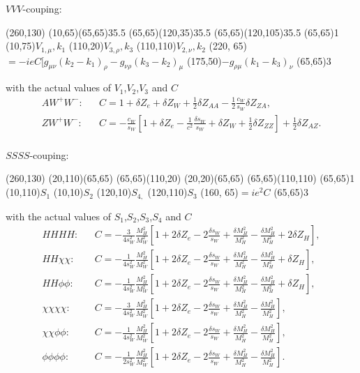$VVV$-couping:

\begin{axopicture}(260,130) %
	\Photon(10,65)(65,65){3}{5.5} 
	\Photon(65,65)(120,35){3}{5.5}
	\Photon(65,65)(120,105){3}{5.5}
	\Vertex(65,65){1}		
	\Text(10,75){$V_{1,\mu}, k_1$}
	\Text(110,20){$V_{3,\rho},k_3$}
	\Text(110,110){$V_{2,\nu},k_2$}
	\Text(220, 65){$=-ieC[g_{\mu\nu}(k_2-k_1)_\rho-g_{\nu\rho}(k_3-k_2)_\mu$}
	\Text(175,50){$-g_{\rho\mu}(k_1-k_3)_\nu$}
	\Vertex(65,65){3}
\end{axopicture}
\newline with the actual values of $V_1$,$V_2$,$V_3$ and $C$
\begin{eqnarray}
AW^+W^-:&&C=1+\delta Z_e+\delta Z_W+\frac{1}{2}\delta Z_{AA}-\frac{1}{2}\frac{c_W}{s_W}\delta Z_{ZA},\nonumber\\
ZW^+W^-:&&C=-\frac{c_W}{s_W}\left[1+\delta Z_e-\frac{1}{c^2}\frac{\delta s_W}{s_W}+\delta Z_W+\frac{1}{2}\delta Z_{ZZ}\right]+\frac{1}{2}\delta Z_{AZ}.\nonumber\\
\end{eqnarray}

$SSSS$-couping:

\begin{axopicture}(260,130) %
	\Line[dash](20,110)(65,65)
	\Line[dash](65,65)(110,20)
	\Line[dash](20,20)(65,65)
	\Line[dash](65,65)(110,110)
	\Vertex(65,65){1}		
	\Text(10,110){$S_{1}$}
	\Text(10,10){$S_{2}$}
	\Text(120,10){$S_{4,}$}
	\Text(120,110){$S_{3}$}
	\Text(160, 65){$=ie^2C$}
	\Vertex(65,65){3}
\end{axopicture}
\newline with the actual values of $S_1$,$S_2$,$S_3$,$S_4$ and $C$
\begin{eqnarray}
HHHH:&& C=-\frac{3}{4s_W^2}\frac{M^2_H}{M^2_W}\left[1+2\delta Z_e-2\frac{\delta s_W}{s_W}+\frac{\delta M^2_H}{M^2_H}-\frac{\delta M^2_H}{M^2_H}+2\delta Z_H\right],\nonumber\\
HH\chi\chi:&& C=-\frac{1}{4s_W^2}\frac{M^2_H}{M^2_W}\left[1+2\delta Z_e-2\frac{\delta s_W}{s_W}+\frac{\delta M^2_H}{M^2_H}-\frac{\delta M^2_H}{M^2_H}+\delta Z_H\right],\nonumber\\
HH\phi\phi:&& C=-\frac{1}{4s_W^2}\frac{M^2_H}{M^2_W}\left[1+2\delta Z_e-2\frac{\delta s_W}{s_W}+\frac{\delta M^2_H}{M^2_H}-\frac{\delta M^2_H}{M^2_H}+\delta Z_H\right],\nonumber\\
\chi\chi\chi\chi:&& C=-\frac{3}{4s_W^2}\frac{M^2_H}{M^2_W}\left[1+2\delta Z_e-2\frac{\delta s_W}{s_W}+\frac{\delta M^2_H}{M^2_H}-\frac{\delta M^2_H}{M^2_H}\right],\nonumber\\
\chi\chi\phi\phi:&& C=-\frac{1}{4s_W^2}\frac{M^2_H}{M^2_W}\left[1+2\delta Z_e-2\frac{\delta s_W}{s_W}+\frac{\delta M^2_H}{M^2_H}-\frac{\delta M^2_H}{M^2_H}\right],\nonumber\\
\phi\phi\phi\phi:&& C=-\frac{1}{2s_W^2}\frac{M^2_H}{M^2_W}\left[1+2\delta Z_e-2\frac{\delta s_W}{s_W}+\frac{\delta M^2_H}{M^2_H}-\frac{\delta M^2_H}{M^2_H}\right].\nonumber\\
\end{eqnarray}

